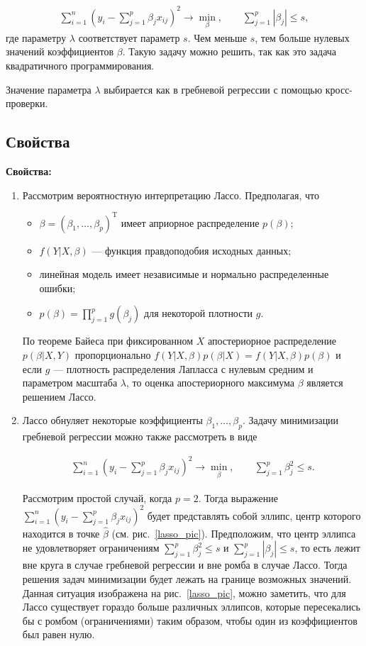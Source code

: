 \documentclass[specialist,
               subf,href,colorlinks=true, 12pt,a4paper]{article} %
\newcommand{\T}{\mathrm{T}}
\numberwithin{equation}{section}
\begin{document}
\begin{align*}
\sum_{i=1}^n(y_i - \sum_{j=1}^p \beta_j x_{ij})^2 \rightarrow \min_{\beta}, \qquad  \sum_{j = 1}^p |\beta_j| \leq s,
\end{align*}
где параметру $\lambda$ соответствует параметр $s$. Чем меньше $s$, тем больше нулевых значений коэффициентов $\beta$. Такую задачу можно решить, так как это задача квадратичного программирования. 

Значение параметра $\lambda$ выбирается как в гребневой регрессии с помощью кросс-проверки.


\subsection{Свойства}


\textbf{Свойства:}
\begin{enumerate}
\item Рассмотрим вероятностную интерпретацию Лассо. Предполагая, что

\begin{itemize}
\item $\beta = (\beta_1, \ldots, \beta_p)^{\T}$ имеет априорное распределение $p(\beta)$;
\item $f(Y|X,\beta)$ --- функция правдоподобия исходных данных;
\item линейная модель имеет независимые и нормально распределенные ошибки; 
\item $p(\beta) = \prod_{j = 1}^p g(\beta_j)$ для некоторой плотности $g$.
\end{itemize}

По теореме Байеса при фиксированном $X$ апостериорное распределение $p(\beta|X,Y)$ пропорционально $f(Y|X,\beta)p(\beta|X) = f(Y|X,\beta)p(\beta)$ и если $g$ --- плотность распределения Лапласса с нулевым средним и параметром масштаба $\lambda$, то оценка апостериорного максимума $\beta$ является решением Лассо. 

\item Лассо обнуляет некоторые коэффициенты $\beta_1, \ldots, \beta_p$. Задачу минимизации гребневой регрессии можно также рассмотреть в виде 

\begin{align*}
\sum_{i=1}^n(y_i - \sum_{j=1}^p \beta_j x_{ij})^2 \rightarrow \min_{\beta}, \qquad  \sum_{j = 1}^p \beta_j^2 \leq s.
\end{align*}

Рассмотрим простой случай, когда $p = 2$. Тогда выражение $\sum_{i=1}^n(y_i - \sum_{j=1}^p \beta_j x_{ij})^2$ будет представлять собой эллипс, центр которого находится в точке $\hat{\beta}$ (см. рис.~\ref{lasso_pic}). Предположим, что центр эллипса не удовлетворяет ограничениям $\sum_{j = 1}^p \beta_j^2 \leq s$ и $\sum_{j = 1}^p |\beta_j| \leq s$, то есть лежит вне круга в случае гребневой регрессии и вне ромба в случае Лассо. Тогда решения задач минимизации будет лежать на границе возможных значений. Данная ситуация изображена на рис.~\ref{lasso_pic}, можно заметить, что для Лассо существует гораздо больше различных эллипсов, которые пересекались бы с ромбом (ограничениями) таким образом, чтобы один из коэффициентов был равен нулю.


\end{enumerate}
\end{document}
